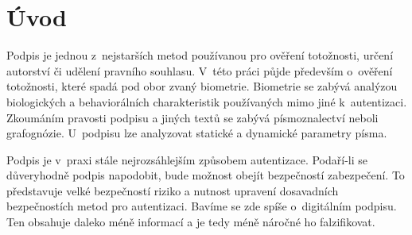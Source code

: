 
%

\chapter{Úvod}
Podpis je jednou z~nejstarších metod používanou pro ověření totožnosti, určení autorství či udělení pravního souhlasu.
V~této práci půjde především o~ověření totožnosti, které spadá pod obor zvaný biometrie.
Biometrie se zabývá analýzou biologických a behaviorálních charakteristik používaných mimo jiné k~autentizaci. 
Zkoumáním pravosti podpisu a jiných textů se zabývá písmoznalectví neboli grafognózie.
U~podpisu lze analyzovat statické a dynamické parametry písma. 

Podpis je v~praxi stále nejrozsáhlejším způsobem autentizace. 
Podaří-li se důveryhodně podpis napodobit, bude možnost obejít bezpečností zabezpečení. 
To představuje velké bezpečností riziko a nutnost upravení dosavadních bezpečnostích metod pro autentizaci. 
Bavíme se zde spíše o~digitálním podpisu. Ten obsahuje daleko méně informací a je tedy méně náročné ho falzifikovat. %


